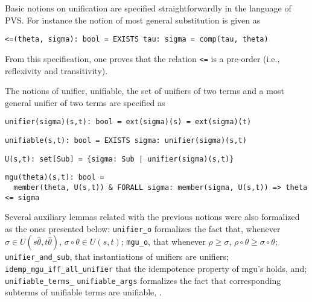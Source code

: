 \documentclass[submission,copyright,creativecommons]{eptcs}
\begin{document}
Basic notions on unification are specified straightforwardly in the
language of PVS.  For instance the notion of most general substitution
is given as

{\small
\begin{verbatim}
<=(theta, sigma): bool = EXISTS tau: sigma = comp(tau, theta)
\end{verbatim}
}

From this specification, one proves that the relation {\tt <=} is a
pre-order (i.e., reflexivity and transitivity).

The notions of unifier, unifiable, the set of unifiers of two terms
and a most general unifier of two terms are specified as

{\small
\begin{verbatim}
unifier(sigma)(s,t): bool = ext(sigma)(s) = ext(sigma)(t)
\end{verbatim}
} {\small
\begin{verbatim}
unifiable(s,t): bool = EXISTS sigma: unifier(sigma)(s,t)
\end{verbatim}
} {\small
\begin{verbatim}
U(s,t): set[Sub] = {sigma: Sub | unifier(sigma)(s,t)}
\end{verbatim}
} {\small
\begin{verbatim}
mgu(theta)(s,t): bool = 
  member(theta, U(s,t)) & FORALL sigma: member(sigma, U(s,t)) => theta <= sigma
\end{verbatim}}

  Several auxiliary lemmas related with the previous notions were also
  formalized as the ones presented below: {\tt unifier\_o} formalizes
  the fact that, whenever $\sigma\in U(s\hat{\theta},t\hat{\theta})$,
  $\sigma\circ\theta \in U(s,t)$; {\tt mgu\_o}, that whenever $\rho
  \geq \sigma$, $\rho\circ\theta \geq \sigma\circ\theta$; {\tt
    unifier\_and\_sub}, that instantiations of unifiers are unifiers;
  {\tt idemp\_mgu\_iff\_all\_unifier} that the idempotence property of
  mgu's holds, and; {\tt unifiable\_terms\_} {\tt unifiable\_args} formalizes the fact that corresponding
  subterms of unifiable terms are unifiable, .
\end{document}
